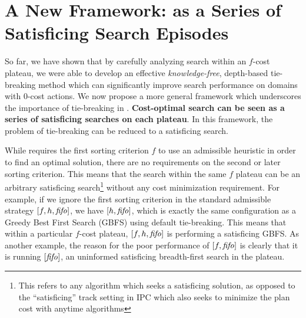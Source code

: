 \clearpage 
\section{A New Framework:  \astar as a Series of Satisficing Search Episodes}
\label{sec:discussion}

So far, we have shown that by carefully analyzing search within an $f$-cost plateau,
we were able to develop an effective
{\it knowledge-free}, depth-based tie-breaking method which can significantly improve search performance on domains with 0-cost actions.
We now propose a more general framework which underscores the importance of tie-breaking in \astar.
\textbf{Cost-optimal search
can be seen as a series of satisficing searches on each plateau}. In this framework, the problem of tie-breaking can be
reduced to a satisficing search.


While \astar requires the first sorting criterion $f$ to use an admissible heuristic in order to find an optimal solution,
there are no requirements on the second or later sorting criterion.
This means that the search within the same $f$ plateau can be an arbitrary  satisficing search\footnote{This refers to any algorithm which seeks a satisficing solution, as opposed to the ``satisficing'' track setting in IPC which also seeks to minimize the plan cost with anytime algorithms} without any cost minimization requirement. For example,
if we ignore the first sorting criterion in the standard admissible strategy
$[f,h,{\text{\textit{fifo}}}]$, we have $[h,{\text{\textit{fifo}}}]$, which is exactly
the same configuration as a Greedy Best First Search (GBFS) using \fifo default tie-breaking. This 
means that within a particular $f$-cost plateau, $[f,h,{\text{\textit{fifo}}}]$ is
performing a satisficing GBFS.
As another example, the reason for the poor performance of $[f,{\text{\textit{fifo}}}]$
is clearly that it is running $[{\text{\textit{fifo}}}]$,
an uninformed satisficing breadth-first search in the plateau.

